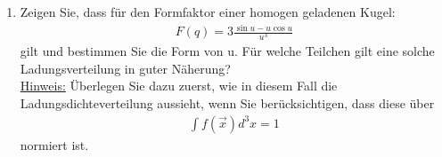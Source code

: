 \documentclass[11pt,a4paper]{scrartcl}
\begin{document}
\begin{enumerate}[start=2, label=(\alph*)]
    \item Zeigen Sie, dass für den Formfaktor einer homogen geladenen Kugel:
    \begin{align*}
        F(q) = 3\frac{\sin{u} - u \cos{u}}{u^3}
    \end{align*}
    gilt und bestimmen Sie die Form von u. Für welche Teilchen gilt eine solche Ladungsverteilung in guter Näherung?\\
    \underline{Hinweis:} Überlegen Sie dazu zuerst, wie in diesem Fall die Ladungsdichteverteilung aussieht, wenn Sie berücksichtigen, dass diese über
    \begin{align*}
        \int f(\vec{x}) d^3x = 1
    \end{align*}
    normiert ist.


\end{enumerate}
\end{document}
